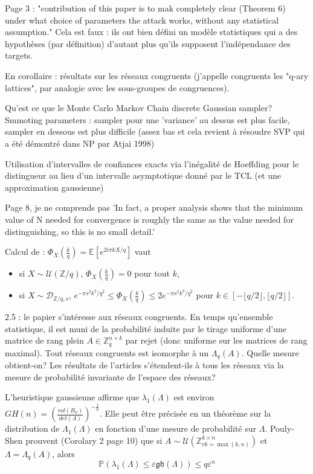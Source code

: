 \documentclass{article}
\begin{document}
Page 3 : "contribution of this paper is to mak completely clear (Theorem 6) under what choice of parameters the attack works, without any statistical assumption." Cela est faux : ils ont bien défini un modèle statistiques qui a des hypothèses (par définition) d'autant plus qu'ils supposent l'indépendance des targets.

En corollaire : résultats sur les réseaux congruents (j'appelle congruents les "q-ary lattices", par analogie avec les sous-groupes de congruences).

Qu'est ce que le Monte Carlo Markov Chain discrete Gaussian sampler? Smmoting parameters : sampler pour une 'variance' au dessus est plus facile, sampler en dessous est plus difficile (assez bas et cela revient à résoudre SVP qui a été démontré dans NP par Atjai 1998)

Utilisation d'intervalles de confiances exacts via l'inégalité de Hoeffding pour le distingueur au lieu d'un intervalle asymptotique donné par le TCL (et une approximation gaussienne)

Page 8, je ne comprends pas 'In fact, a proper analysis shows that the minimum value of N needed for convergence is roughly the same as the value needed for distinguishing, so this is no small detail.'

Calcul de \cite{19} : $\Phi_X(\frac{k}{q}) = \mathbb E[e^{2i\pi k X/q}] $ vaut
\begin{itemize}
\item si $X\sim \mathcal U(\mathbb Z/q)$, $\Phi_X(\frac{k}{q})  = 0$ pour tout $k$,
\item si $X\sim \mathcal D_{\mathbb Z/q , s}$, $ e^{-\pi s^2k^2 / q^2} \leq \Phi_X(\frac{k}{q})  \leq 2e^{-\pi s^2k^2 / q^2}$ pour $k\in [-\lfloor q/2\rfloor , \lfloor q/2\rfloor ]$.
\end{itemize}

2.5 : le papier s'intéresse aux réseaux congruents. En temps qu'ensemble statistique, il est muni de la probabilité induite par le tirage uniforme d'une matrice de rang plein $A\in \mathbb Z_q^{n\times k}$ par rejet (donc uniforme sur les matrices de rang maximal). Tout réseaux congruents est isomorphe à un $\Lambda_q(A)$. Quelle mesure obtient-on? Les résultats de l'articles s'étendent-ils à tous les réseaux via la mesure de probabilité invariante de l'espace des réseaux?  

L'heuristique gaussienne affirme que $\lambda_1(\Lambda)$ est environ $GH(n) = \left( \frac{vol(B_n)}{det(\Lambda)}\right)^{-\frac{1}{n}}$. Elle peut être précisée en un théorème sur la distribution de $\Lambda_1(\Lambda)$ en fonction d'une mesure de probabilité sur $\Lambda$. Pouly-Shen prouvent (Corolary 2 page 10) que si $A\sim \mathcal U(\mathbb Z^{k \times n}_{rk = \max (k,n)})$ et $\Lambda = \Lambda_q(A)$, alors
$$ \mathbb P\left( \lambda_1( \Lambda ) \leq \varepsilon \mathfrak{gh}(\Lambda) \right) \leq q\varepsilon^n  $$
\end{document}
